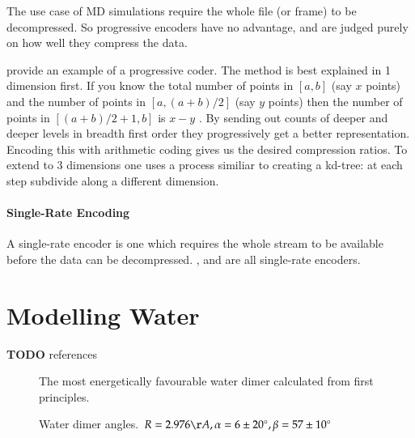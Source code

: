 \documentclass{report}
\newcommand{\degree}{\ensuremath{^\circ}}
\newcommand{\todo}{\textbf{TODO} }
\begin{document}
The use case of MD simulations require the whole file (or frame) to be
decompressed. So progressive encoders have no advantage, and are judged purely
on how well they compress the data.

\citep{devillers2000gci} provide an example of a progressive coder. The method
is best explained in 1 dimension first. If you know the total number of points
in $[a, b]$ (say $x$ points) and the number of points in $[a, (a+b)/2]$ (say
$y$ points) then the number of points in $[(a+b)/2+1, b]$ is $x - y$ . By
sending out counts of deeper and deeper levels in breadth first order they
progressively get a better representation. Encoding this with arithmetic
coding gives us the desired compression ratios. To extend to 3 dimensions one
uses a process similiar to creating a kd-tree: at each step subdivide along a
different dimension.

\paragraph{Single-Rate Encoding}
A single-rate encoder is one which requires the whole stream to be available
before the data can be decompressed. \citep{omeltchenko2000sls},
\citep{gumholdcomp} and \citep{merrycomp} are all single-rate encoders.


\section{Modelling Water}

\todo references

\begin{figure}[h]
\centering
{}
\caption{The most energetically favourable water dimer calculated from first
  principles.}
\label{fig:dimer}
\end{figure}

\begin{figure}[h]
\centering
{}
\caption{Water dimer angles. $R = 2.976\AA, \alpha = 6 \pm 20\degree, \beta =
  57 \pm 10\degree$}
\label{fig:dimer-angle}
\end{figure}
\end{document}
